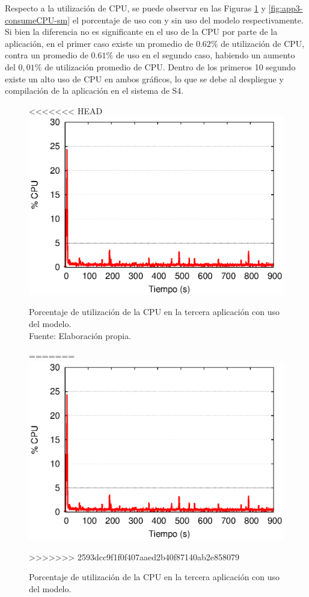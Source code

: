 
Respecto a la utilizaci\'on de CPU, se puede observar en las Figuras \ref{fig:app3-consumeCPU-cm} y \ref{fig:app3-consumeCPU-sm} el porcentaje de uso con y sin uso del modelo respectivamente. Si bien la diferencia no es significante en el uso de la CPU por parte de la aplicaci\'on, en el primer caso existe un promedio de $0.62\%$ de utilizaci\'on de CPU, contra un promedio de $0.61\%$ de uso en el segundo caso, habiendo un aumento del $0,01\%$ de utilizaci\'on promedio de CPU. Dentro de los primeros 10 segundo existe un alto uso de CPU en ambos gr\'aficos, lo que se debe al despliegue y compilaci\'on de la aplicaci\'on en el sistema de S4.

\begin{figure}[!ht]
<<<<<<< HEAD
	\centering
	\captionsetup{justification=centering}
    \includegraphics[scale=0.65]{images/exp/app3/cm/fisical/consumeCPU.eps}
    \caption[Porcentaje de utilización de la CPU en la tercera aplicación con uso del modelo.]{Porcentaje de utilización de la CPU en la tercera aplicación con uso del modelo.\\Fuente: Elaboración propia.}
=======
\centering
    \includegraphics[scale=0.75]{images/exp/app3/cm/fisical/consumeCPU.eps}
    \caption{Porcentaje de utilizaci\'on de la CPU en la tercera aplicaci\'on con uso del modelo.}
>>>>>>> 2593dcc9f1f0f407aaed2b40f87140ab2e858079
    \label{fig:app3-consumeCPU-cm}
\end{figure}

